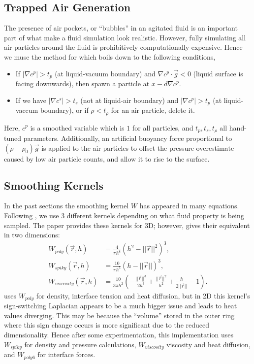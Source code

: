 \documentclass[acmtog,review]{acmart}
\begin{document}
\subsection{Trapped Air Generation}
The presence of air pockets, or ``bubbles'' in an agitated fluid is an important part of what make a fluid simulation look realistic. However, fully simulating all air particles around the fluid is prohibitively computationally expensive. Hence we muse the method for \cite{muller5} which boils down to the following conditions,
\begin{itemize}
  \item If $|\nabla c^p| > t_p$ (at liquid-vacuum boundary) and $\nabla c^p \cdot \vec{g} < 0$ (liquid surface is facing downwards), then spawn a particle at $x - d \nabla c^p$.
  \item If we have $|\nabla c^s| > t_s$ (not at liquid-air boundary) and $|\nabla c^p| > t_p$ (at liquid-vaccum boundary), or if $\rho < t_\rho$ for an air particle, delete it.
\end{itemize}
Here, $c^p$ is a smoothed variable which is $1$ for all particles, and $t_p, t_s, t_{\rho}$ all hand-tuned parameters. Additionally, an artificial buoyancy force proportional to $(\rho - \rho_0)\vec{g}$ is applied to the air particles to offset the pressure overestimate caused by low air particle counts, and allow it to rise to the surface. 

\subsection{Smoothing Kernels}
In the past sections the smoothing kernel $W$ has appeared in many equations. Following \cite{muller3}, we use 3 different kernels depending on what fluid property is being sampled. The paper provides these kernels for 3D; however, \cite{adithya12} gives their equivalent in two dimensions:
\begin{align*}
    W_{poly}(\vec{r}, h) &= \frac{4}{\pi h^8} (h^2 - ||\vec{r}||^2)^3, \\
    W_{spiky}(\vec{r}, h) &= \frac{10}{\pi h^5}(h - ||\vec{r}||)^3, \\
    W_{viscosity}(\vec{r}, h) &= \frac{10}{3\pi h^2}\left(-\frac{||\vec{r}||^3}{2h^3} + \frac{||\vec{r}||^2}{h^2} + \frac{h}{2||\vec{r}||} - 1\right).
\end{align*}
\cite{muller3} uses $W_{poly}$ for density, interface tension and heat diffusion, but in 2D this kernel's sign-switching Laplacian appears to be a much bigger issue and leads to heat values diverging. This may be because the ``volume'' stored in the outer ring where this sign change occurs is more significant due to the reduced dimensionality. Hence after some experimentation, this implementation uses $W_{spiky}$ for density and pressure calculations, $W_{viscosity}$ viscosity and heat diffusion, and $W_{poly6}$ for interface forces.  
\end{document}
